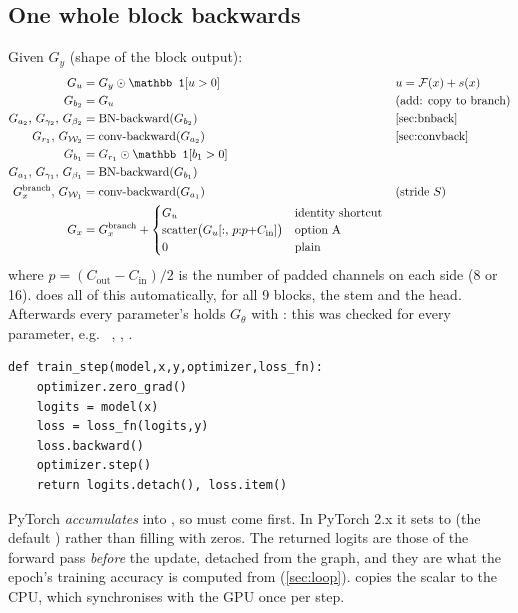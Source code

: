 \subsection{One whole block backwards}

\begin{repo}
Given $G_y$ (shape of the block output):
\begin{align*}
  G_u &= G_y\odot\mathbb 1[u>0] && u=\mathcal F(x)+s(x)\\
  G_{b_2} &= G_u && \text{(add: copy to branch)}\\
  G_{a_2},\,G_{\gamma_2},\,G_{\beta_2} &= \text{BN-backward}(G_{b_2}) && \text{\cref{sec:bnback}}\\
  G_{r_1},\,G_{\mathcal W_2} &= \text{conv-backward}(G_{a_2}) && \text{\cref{sec:convback}}\\
  G_{b_1} &= G_{r_1}\odot\mathbb 1[b_1>0]\\
  G_{a_1},\,G_{\gamma_1},\,G_{\beta_1} &= \text{BN-backward}(G_{b_1})\\
  G_x^{\text{branch}},\,G_{\mathcal W_1} &= \text{conv-backward}(G_{a_1}) && \text{(stride $S$)}\\
  G_x &= G_x^{\text{branch}} + \begin{cases}G_u & \text{identity shortcut}\\ \text{scatter}\big(G_u[:,\,p{:}p{+}C_\text{in}]\big) & \text{option A}\\ 0 & \text{plain}\end{cases}
\end{align*}
where $p=(C_\text{out}-C_\text{in})/2$ is the number of padded channels on each side (8 or 16).
 does all of this automatically, for all 9 blocks, the stem and the head. Afterwards every parameter's  holds $G_\theta$ with : this was checked for every parameter, e.g.\  ,  ,  .
\end{repo}

\begin{warn}
\begin{lstlisting}[firstnumber=4]
def train_step(model,x,y,optimizer,loss_fn):
    optimizer.zero_grad()
    logits = model(x)
    loss = loss_fn(logits,y)
    loss.backward()
    optimizer.step()
    return logits.detach(), loss.item()
\end{lstlisting}
PyTorch \emph{accumulates} into , so  must come first. In PyTorch 2.x it sets  to  (the default ) rather than filling with zeros. The returned logits are those of the forward pass \emph{before} the update, detached from the graph, and they are what the epoch's training accuracy is computed from (\cref{sec:loop}).  copies the scalar to the CPU, which synchronises with the GPU once per step.
\end{warn}
